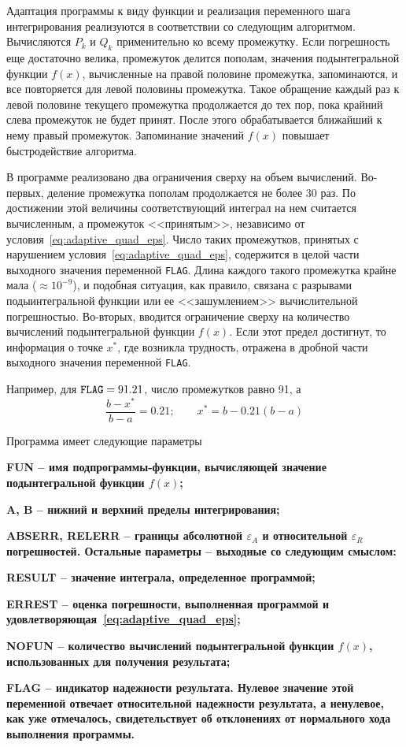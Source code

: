 Адаптация программы к виду функции и реализация переменного шага интегрирования
реализуются в соответствии со следующим алгоритмом. Вычисляются $P_k$ и $Q_k$
применительно ко всему промежутку. Если погрешность еще достаточно велика,
промежуток делится пополам, значения подынтегральной функции $f(x)$,
вычисленные на правой половине промежутка, запоминаются, и все повторяется
для левой половины промежутка. Такое обращение каждый раз к левой половине
текущего промежутка продолжается до тех пор, пока крайний слева промежуток не
будет принят. После этого обрабатывается ближайший к нему правый промежуток.
Запоминание значений $f(x)$ повышает быстродействие алгоритма.

В программе реализовано два ограничения сверху на объем вычислений. Во-первых,
деление промежутка пополам продолжается не более 30 раз. По достижении этой
величины соответствующий интеграл на нем считается вычисленным, а промежуток
<<принятым>>, независимо от условия~\eqref{eq:adaptive_quad_eps}. Число таких
промежутков, принятых с нарушением условия~\eqref{eq:adaptive_quad_eps},
содержится в целой части выходного значения переменной \verb|FLAG|. Длина
каждого такого промежутка крайне мала ($\displaystyle \approx 10^{-9}$), и подобная ситуация,
как правило, связана с разрывами подыинтегральной функции или ее <<зашумлением>>
вычислительной погрешностью. Во-вторых, вводится ограничение сверху на
количество вычислений подынтегральной функции $f(x)$. Если этот предел достигнут,
то информация о точке $\displaystyle x^{*}$, где возникла трудность, отражена в
дробной части выходного значения переменной \verb|FLAG|.

Например, для $\verb|FLAG| = 91.21$, число промежутков равно 91, а
\begin{equation*}
    \frac{b-x^{*}}{b-a} = 0.21; \qquad x^{*} = b - 0.21(b-a)
\end{equation*}

Программа имеет следующие параметры

\bf{FUN} -- имя подпрограммы-функции, вычисляющей значение подынтегральной
функции $f(x)$;

\bf{A, B} -- нижний и верхний пределы интегрирования;

\bf{ABSERR, RELERR} -- границы абсолютной $\varepsilon_A$ и относительной
$\varepsilon_R$ погрешностей. Остальные параметры -- выходные со следующим смыслом:

\bf{RESULT} -- значение интеграла, определенное программой;

\bf{ERREST} -- оценка погрешности, выполненная программой и удовлетворяющая~\eqref{eq:adaptive_quad_eps};

\bf{NOFUN} -- количество вычислений подынтегральной функции $f(x)$, использованных для получения результата;

\bf{FLAG} -- индикатор надежности результата. Нулевое значение этой переменной отвечает
относительной надежности результата, а ненулевое, как уже отмечалось, свидетельствует
об отклонениях от нормального хода выполнения программы.
